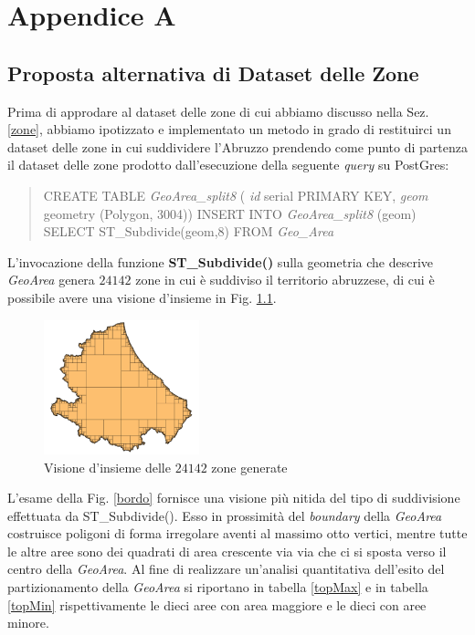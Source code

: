 

\chapter{Appendice A}

\section{Proposta alternativa di Dataset delle Zone}
\label{nostraProposta}
Prima di approdare al dataset delle zone di cui abbiamo discusso nella Sez. \ref{zone}, abbiamo ipotizzato e implementato un metodo in grado di restituirci un dataset delle zone in cui suddividere l'Abruzzo prendendo come punto di partenza il dataset delle zone prodotto dall'esecuzione della seguente \textit{query} su PostGres:
\begin{quote}
CREATE TABLE \textit{GeoArea\_split8} (
\newline
\textit{id} serial PRIMARY KEY,
\newline
\textit{geom} geometry (Polygon, 3004))
\newline
\newline
INSERT INTO \textit{GeoArea\_split8} (geom) 
\newline
SELECT ST\_Subdivide(geom,8)
\newline
FROM \textit{Geo\_Area}
\end{quote}

L'invocazione della funzione \textbf{ST\_Subdivide()} sulla geometria che descrive \textit{GeoArea} genera $24142$ zone in cui è suddiviso il territorio abruzzese, di cui è possibile avere una visione d'insieme in Fig. \ref{nostrodataset}.
\begin{figure}[h]
\centering
\includegraphics[width=0.4\textwidth]{img/nostrodataset}
\caption{Visione d'insieme delle $24142$ zone generate}
\label{nostrodataset}
\end{figure}
L'esame della Fig. \ref{bordo} fornisce una visione più nitida del tipo di suddivisione effettuata da ST\_Subdivide(). Esso in prossimità del \textit{boundary} della \textit{GeoArea} costruisce poligoni di forma irregolare aventi al massimo otto vertici, mentre tutte le altre aree sono dei quadrati di area crescente via via che ci si sposta verso il centro della \textit{GeoArea}.
Al fine di realizzare un'analisi quantitativa dell'esito del partizionamento della \textit{GeoArea} si riportano in tabella \ref{topMax} e in tabella \ref{topMin} rispettivamente le dieci aree con area maggiore e le dieci con aree minore.

